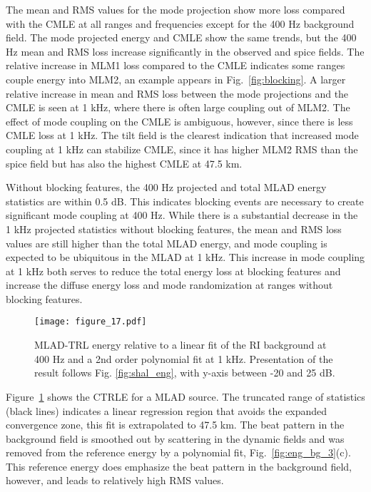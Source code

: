 \documentclass[preprint,NumberedRefs]{JASA}
\begin{document}
The mean and RMS values for the mode projection show more loss compared with the CMLE at all ranges and frequencies except for the 400 Hz background field. The mode projected energy and CMLE show the same trends, but the 400 Hz mean and RMS loss increase significantly in the observed and spice fields. The relative increase in MLM1 loss compared to the CMLE indicates some ranges couple energy into MLM2, an example appears in Fig.~\ref{fig:blocking}. A larger relative increase in mean and RMS loss between the mode projections and the CMLE is seen at 1 kHz, where there is often large coupling out of MLM2. The effect of mode coupling on the CMLE is ambiguous, however, since there is less CMLE loss at 1 kHz. The tilt field is the clearest indication that increased mode coupling at 1 kHz can stabilize CMLE, since it has higher MLM2 RMS than the spice field but has also the highest CMLE at 47.5 km.

Without blocking features, the 400 Hz projected and total MLAD energy statistics are within 0.5 dB. This indicates blocking events are necessary to create significant mode coupling at 400 Hz. While there is a substantial decrease in the 1 kHz projected statistics without blocking features, the mean and RMS loss values are still higher than the total MLAD energy, and mode coupling is expected to be ubiquitous in the MLAD at 1 kHz. This increase in mode coupling at 1 kHz both serves to reduce the total energy loss at blocking features and increase the diffuse energy loss and mode randomization at ranges without blocking features.

\begin{figure}
\texttt{[image: figure\_17.pdf]}
        \caption{MLAD-TRL energy relative to a linear fit of the RI background at 400 Hz and a 2nd order polynomial fit at 1 kHz. Presentation of the result follows Fig. \ref{fig:shal_eng}, with y-axis between -20 and 25 dB.}
    \label{fig:eng_tl}
\end{figure}
Figure~\ref{fig:eng_tl} shows the CTRLE for a MLAD source. The truncated range of statistics (black lines) indicates a linear regression region that avoids the expanded convergence zone, this fit is extrapolated to 47.5 km. The beat pattern in the background field is smoothed out by scattering in the dynamic fields and was removed from the reference energy by a polynomial fit, Fig.~\ref{fig:eng_bg_3}(c). This reference energy does emphasize the beat pattern in the background field, however, and leads to relatively high RMS values.
\end{document}
